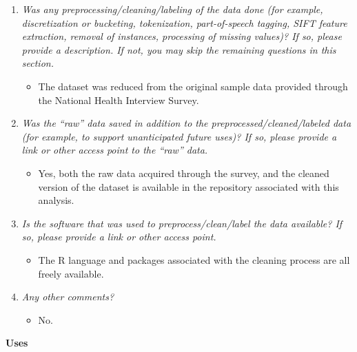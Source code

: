 \documentclass[
]{article}
\providecommand{\tightlist}{%
  \setlength{\itemsep}{0pt}\setlength{\parskip}{0pt}}
\begin{document}
\begin{enumerate}
\def\labelenumi{\arabic{enumi}.}
\tightlist
\item
  \emph{Was any preprocessing/cleaning/labeling of the data done (for example, discretization or bucketing, tokenization, part-of-speech tagging, SIFT feature extraction, removal of instances, processing of missing values)? If so, please provide a description. If not, you may skip the remaining questions in this section.}

  \begin{itemize}
  \tightlist
  \item
    The dataset was reduced from the original sample data provided through the National Health Interview Survey.
  \end{itemize}
\item
  \emph{Was the ``raw'' data saved in addition to the preprocessed/cleaned/labeled data (for example, to support unanticipated future uses)? If so, please provide a link or other access point to the ``raw'' data.}

  \begin{itemize}
  \tightlist
  \item
    Yes, both the raw data acquired through the survey, and the cleaned version of the dataset is available in the repository associated with this analysis.
  \end{itemize}
\item
  \emph{Is the software that was used to preprocess/clean/label the data available? If so, please provide a link or other access point.}

  \begin{itemize}
  \tightlist
  \item
    The R language and packages associated with the cleaning process are all freely available.
  \end{itemize}
\item
  \emph{Any other comments?}

  \begin{itemize}
  \tightlist
  \item
    No.
  \end{itemize}
\end{enumerate}

\textbf{Uses}
\end{document}
